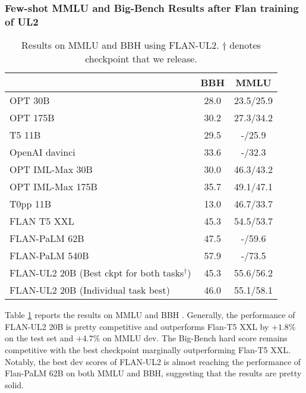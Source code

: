 \documentclass[10pt]{article}
\begin{document}
\subsubsection{Few-shot MMLU and Big-Bench Results after Flan training of UL2}
\begin{table}[H]
    \centering
    \begin{tabular}{l|cc}
    \toprule
         &  BBH & MMLU \\
             \midrule
        OPT 30B & 28.0 & 23.5/25.9 \\
        OPT 175B & 30.2 & 27.3/34.2 \\
        T5 11B & 29.5 & -/25.9 \\
        OpenAI davinci & 33.6 & -/32.3 \\
        \midrule
        OPT IML-Max 30B & 30.0 & 46.3/43.2 \\ 
        OPT IML-Max 175B & 35.7 & 49.1/47.1 \\
        T0pp 11B & 13.0 & 46.7/33.7 \\
        FLAN T5 XXL & 45.3 & 54.5/53.7 \\
        FLAN-PaLM 62B & 47.5 & -/59.6 \\ 
        FLAN-PaLM 540B & 57.9 & -/73.5 \\
        \midrule
        FLAN-UL2 20B (Best ckpt for both tasks$^\dagger$) & 45.3 & 55.6/56.2 \\
        FLAN-UL2 20B (Individual task best) &46.0  & 55.1/58.1\\
        \bottomrule
    \end{tabular}
    \caption{Results on MMLU and BBH using FLAN-UL2. $\dagger$ denotes checkpoint that we release.}
    \label{tab:flan_results}
\end{table}

Table \ref{tab:flan_results} reports the results on MMLU and BBH \citep{suzgun2022challenging}. Generally, the performance of FLAN-UL2 20B is pretty competitive and outperforms Flan-T5 XXL by $+1.8\%$ on the test set and $+4.7\%$ on MMLU dev. The Big-Bench hard score remains competitive with the best checkpoint marginally outperforming Flan-T5 XXL. Notably, the best dev scores of FLAN-UL2 is almost reaching the performance of Flan-PaLM 62B on both MMLU and BBH, suggesting that the results are pretty solid.
\end{document}
